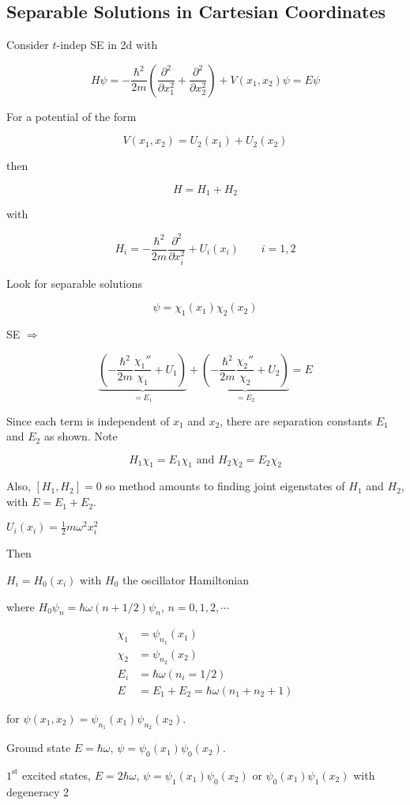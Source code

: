 \documentclass[a4paper]{article}
\begin{document}
\subsection{Separable Solutions in Cartesian Coordinates}


Consider $ t $-indep SE in 2d with 

\[ H \psi = - \frac{\hbar^{2}}{2m} \left(  \frac{\partial^{2} }{\partial x_{1}^{2}} + \frac{\partial^{2} }{\partial x_{2}^{2}} \right)  + V(x_{1},x_{2}) \psi = E \psi \]

For a potential of the form

\[ V(x_{1},x_{2}) = U_{2}(x_{1}) + U_{2}(x_{2}) \] 

then

\[ H = H_{1} + H_{2} \]

with 

\[ H_{i} = - \frac{\hbar^{2}}{2m}  \frac{\partial^{2} }{\partial x_{i}^{2}} + U_{i}(x_{i}) \qquad i = 1,2 \]


Look for separable solutions

\[ \psi = \chi_{1}(x_{1})\chi_{2}(x_{2}) \]

SE $ \Rightarrow  $

\[ \underbrace{\left(  - \frac{\hbar^{2}}{2m} \frac{\chi_{1}''}{\chi_{1}} + U_{1} \right)}_{= E_{1}} + \underbrace{\left(  - \frac{\hbar^{2}}{2m} \frac{\chi_{2}''}{\chi_{2}} + U_{2} \right)}_{= E_{2}}   = E  \]

Since each term is independent of $ x_{1} $ and $ x_{2} $, there are separation constants $ E_{1} $  and  $E_{2} $ as shown. Note 

\[ H_{1}\chi_{1} = E_{1}\chi_{1} \text{ and } H_{2}\chi_{2} = E_{2} \chi_{2} \]

Also, $ [ H_{1},H_{2}] = 0 $ so method amounts to finding joint eigenstates of $ H_{1} $ and $ H_{2} $, with $E = E_{1} + E_{2} $. 

\begin{eg}
	$ U_{i}(x_{i}) = \frac{1}{2} m \omega^{2} x_{i}^{2}   $
	
	Then
	
	$ H_{i} = H_{0}(x_{i}) $
	with $ H_{0} $ the oscillator Hamiltonian
	
	where $ H_{0} \psi_{n} = \hbar \omega ( n + 1/2) \psi_{n }$, $ n = 0,1,2,\cdots $
	
	
	\begin{align*}
	\chi_{1}&  = \psi_{n_{1}}(x_{1}) \\
	\chi_{2} & = \psi_{n_{2}}(x_{2}) \\
	E_{i} & = \hbar \omega(n_{i} = 1/2) \\
	E & = E_{1} + E_{2} = \hbar \omega (n_{1} + n_{2} + 1 )
	\end{align*}
	
	 for $ \psi(x_{1},x_{2}) = \psi_{n_{1}}(x_{1}) \psi_{n_{2}}(x_{2})    $.
	 
	 Ground state $ E = \hbar \omega $, $ \psi = \psi_{0}(x_{1}) \psi_{0}(x_{2}) $.
	 
	 $ 1^{\text{st}} $ excited states, $ E = 2 \hbar \omega $, $ 
	 \psi = \psi_{1}(x_{1}) \psi_{0}(x_{2}) $ or $ \psi_{0}(x_{1})\psi_{1}(x_{2}) $ with degeneracy 2
	
	
\end{eg}
\end{document}
